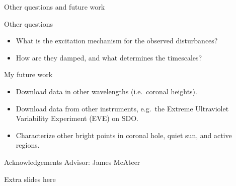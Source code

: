 \documentclass[11pt,table]{beamer}
\begin{document}
\begin{frame}{Other questions and future work}
    \begin{block}{Other questions}
        \begin{itemize}
            \item What is the excitation mechanism for the observed
                disturbances?
            \item How are they damped, and what determines the timescales?
        \end{itemize}
    \end{block}
    \begin{block}{My future work}
        \begin{itemize}
            \item Download data in other wavelengths (i.e.\ coronal heights).
            \item Download data from other instruments,
                e.g.\ the Extreme Ultraviolet Variability Experiment
                (EVE) on SDO\@.
            \item Characterize other bright points in coronal hole,
                quiet sun, and active regions.
        \end{itemize}
    \end{block}
\end{frame}%
{%
\begin{frame}[t]
\end{frame}}%
\begin{frame}{Acknowledgements}
    Advisor: James McAteer
\end{frame}%

\begin{frame}{Extra slides here}
\end{frame}
\end{document}

